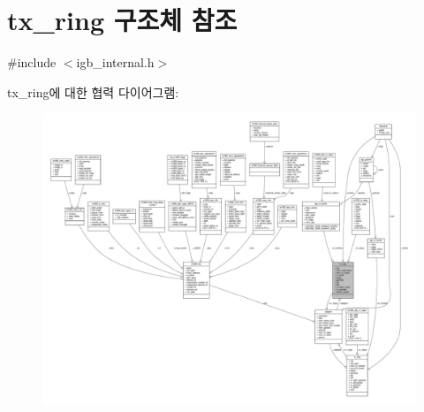 \hypertarget{structtx__ring}{}\section{tx\+\_\+ring 구조체 참조}
\label{structtx__ring}


{\ttfamily \#include $<$igb\+\_\+internal.\+h$>$}



tx\+\_\+ring에 대한 협력 다이어그램\+:
\nopagebreak
\begin{figure}[H]
\begin{center}
\leavevmode
\includegraphics[width=350pt]{structtx__ring__coll__graph}
\end{center}
\end{figure}
